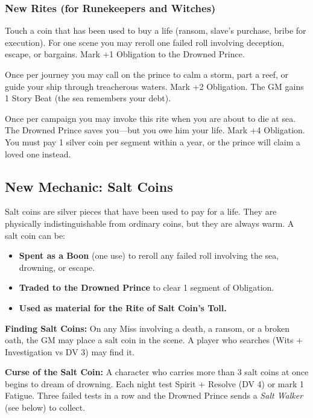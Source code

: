 \documentclass[12pt]{article}
\begin{document}
\subsubsection{New Rites (for Runekeepers and Witches)}
\begin{description}[leftmargin=!,labelwidth=\widthof{\bfseries High}]
  \item[Salt Coin's Toll (Low, 4 XP)] Touch a coin that has been used to buy a life (ransom, slave's purchase, bribe for execution). For one scene you may reroll one failed roll involving deception, escape, or bargains. Mark +1 Obligation to the Drowned Prince.
  \item[Drowned Prince's Favor (Standard, 8 XP)] Once per journey you may call on the prince to calm a storm, part a reef, or guide your ship through treacherous waters. Mark +2 Obligation. The GM gains 1 Story Beat (the sea remembers your debt).
  \item[The Interest Comes Due (High, 12 XP)] Once per campaign you may invoke this rite when you are about to die at sea. The Drowned Prince saves you---but you owe him your life. Mark +4 Obligation. You must pay 1 silver coin per segment within a year, or the prince will claim a loved one instead.
\end{description}

\subsection{New Mechanic: Salt Coins}
Salt coins are silver pieces that have been used to pay for a life. They are physically indistinguishable from ordinary coins, but they are always warm. A salt coin can be:
\begin{itemize}
  \item \textbf{Spent as a Boon} (one use) to reroll any failed roll involving the sea, drowning, or escape.
  \item \textbf{Traded to the Drowned Prince} to clear 1 segment of Obligation.
  \item \textbf{Used as material for the Rite of Salt Coin's Toll.}
\end{itemize}

\textbf{Finding Salt Coins:} On any Miss involving a death, a ransom, or a broken oath, the GM may place a salt coin in the scene. A player who searches (Wits + Investigation vs DV 3) may find it.

\textbf{Curse of the Salt Coin:} A character who carries more than 3 salt coins at once begins to dream of drowning. Each night test Spirit + Resolve (DV 4) or mark 1 Fatigue. Three failed tests in a row and the Drowned Prince sends a \textit{Salt Walker} (see below) to collect.
\end{document}
